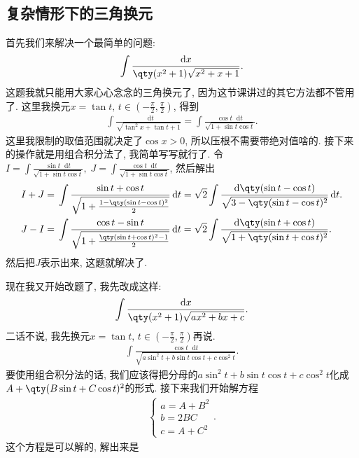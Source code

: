 \documentclass{ctexbook}
\newcommand*{\dif}{\mathop{}\!\mathrm{d}}
\begin{document}
{\subsection{复杂情形下的三角换元}
首先我们来解决一个最简单的问题: 
\begin{align*}
\int\frac{\dif{x}}{\qty(x^{2}+1)\sqrt{x^{2}+x+1}}
.\end{align*}
这题我就只能用大家心心念念的三角换元了, 因为这节课讲过的其它方法都不管用了. 这里我换元$x=\tan{t},\,t\in\left(-\frac{\pi}{2},\frac{\pi}{2}\right)$, 得到
\begin{align*}
\int\frac{\dif{t}}{\sqrt{\tan^{2}{x}+\tan{t}+1}}=\int\frac{\cos{t}\dif{t}}{\sqrt{1+\sin{t}\cos{t}}}
.\end{align*}
这里我限制的取值范围就决定了$\cos{x}>0$, 所以压根不需要带绝对值啥的. 接下来的操作就是用组合积分法了, 我简单写写就行了. 令$I=\int\frac{\sin{t}\dif{t}}{\sqrt{1+\sin{t}\cos{t}}},\;J=\int\frac{\cos{t}\dif{t}}{\sqrt{1+\sin{t}\cos{t}}}$, 然后解出
\begin{align*}
I+J={}&\int\frac{\sin{t}+\cos{t}}{\sqrt{1+\frac{1-\qty(\sin{t}-\cos{t})^{2}}{2}}}\dif{t}=\sqrt{2}\int\frac{\dif{\qty(\sin{t}-\cos{t})}}{\sqrt{3-\qty(\sin{t}-\cos{t})^{2}}}\dif{t}.\\
J-I={}&\int\frac{\cos{t}-\sin{t}}{\sqrt{1+\frac{\qty(\sin{t}+\cos{t})^{2}-1}{2}}}\dif{t}=\sqrt{2}\int\frac{\dif{\qty(\sin{t}+\cos{t})}}{\sqrt{1+\qty(\sin{t}+\cos{t})^{2}}}
.\end{align*}
然后把$J$表示出来, 这题就解决了. \par
现在我又开始改题了, 我先改成这样: 
\begin{align*}
\int\frac{\dif{x}}{\qty(x^{2}+1)\sqrt{ax^{2}+bx+c}}
.\end{align*}
二话不说, 我先换元$x=\tan{t},\,t\in\left(-\frac{\pi}{2},\frac{\pi}{2}\right)$再说. 
\begin{align*}
\int\frac{\cos{t}\dif{t}}{\sqrt{a\sin^{2}{t}+b\sin{t}\cos{t}+c\cos^{2}{t}}}
.\end{align*}
要使用组合积分法的话, 我们应该得把分母的$a\sin^{2}{t}+b\sin{t}\cos{t}+c\cos^{2}{t}$化成\\$A+\qty(B\sin{t}+C\cos{t})^{2}$的形式. 接下来我们开始解方程
\begin{align*}
\begin{cases}
a=A+B^{2}\\
b=2BC\\
c=A+C^{2}
\end{cases}
.\end{align*}
这个方程是可以解的, 解出来是
\begin{align*}

\end{align*}}
\end{document}
